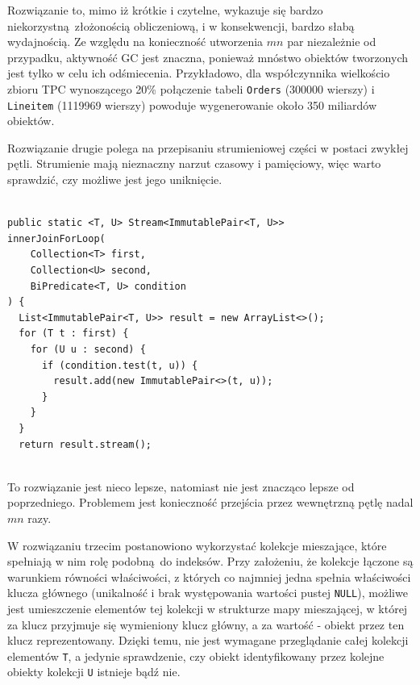 \documentclass[12pt,twoside,openright]{extarticle}
\begin{document}
    Rozwiązanie to, mimo iż krótkie i czytelne, wykazuje się bardzo niekorzystną złożonością obliczeniową, i w konsekwencji, bardzo słabą wydajnością. Ze względu na konieczność utworzenia $ mn $ par niezależnie od przypadku, aktywność GC jest znaczna, ponieważ mnóstwo obiektów tworzonych jest tylko w celu ich odśmiecenia. Przykładowo, dla współczynnika wielkościo zbioru TPC wynoszącego 20\% połączenie tabeli \texttt{Orders} (300000 wierszy) i \texttt{Lineitem} (1119969 wierszy) powoduje wygenerowanie około 350 miliardów obiektów.

    Rozwiązanie drugie polega na przepisaniu strumieniowej części w postaci zwykłej pętli. Strumienie mają nieznaczny narzut czasowy i pamięciowy, więc warto sprawdzić, czy możliwe jest jego uniknięcie.

\begin{lstlisting}[label=join2, caption=Rozwiązanie nr 2]

public static <T, U> Stream<ImmutablePair<T, U>>
innerJoinForLoop(
    Collection<T> first,
    Collection<U> second,
    BiPredicate<T, U> condition
) {
  List<ImmutablePair<T, U>> result = new ArrayList<>();
  for (T t : first) {
    for (U u : second) {
      if (condition.test(t, u)) {
        result.add(new ImmutablePair<>(t, u));
      }
    }
  }
  return result.stream();
    

\end{lstlisting}

    To rozwiązanie jest nieco lepsze, natomiast nie jest znacząco lepsze od poprzedniego. Problemem jest konieczność przejścia przez wewnętrzną pętlę nadal $ mn $ razy.

    W rozwiązaniu trzecim postanowiono wykorzystać kolekcje mieszające, które spełniają w nim rolę podobną do indeksów. Przy założeniu, że kolekcje łączone są warunkiem równości właściwości, z których co najmniej jedna spełnia właściwości klucza głównego (unikalność i brak występowania wartości pustej \texttt{NULL}), możliwe jest umieszczenie elementów tej kolekcji w strukturze mapy mieszającej, w której za klucz przyjmuje się wymieniony klucz główny, a za wartość - obiekt przez ten klucz reprezentowany. Dzięki temu, nie jest wymagane przeglądanie całej kolekcji elementów \texttt{T}, a jedynie sprawdzenie, czy obiekt identyfikowany przez kolejne obiekty kolekcji \texttt{U} istnieje bądź nie.
\end{document}
